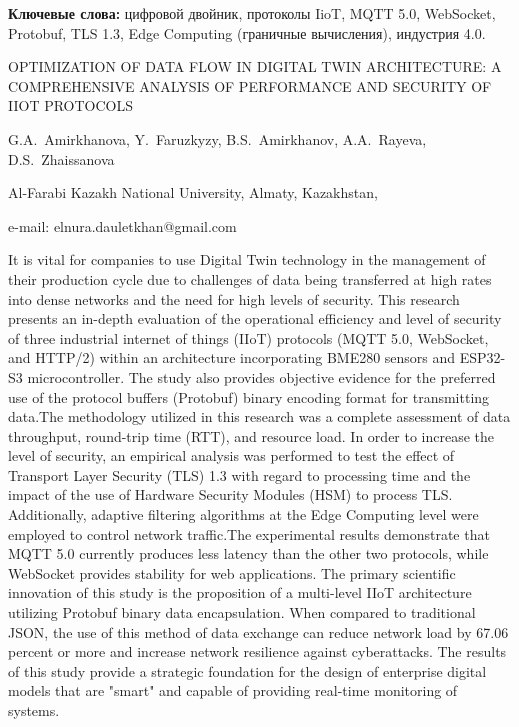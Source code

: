 {\bfseries Ключевые слова:} цифровой двойник, протоколы IioT, MQTT 5.0,
WebSocket, Protobuf, TLS 1.3, Edge Computing (граничные вычисления),
индустрия 4.0.

\begin{header}
OPTIMIZATION OF DATA FLOW IN DIGITAL TWIN ARCHITECTURE: A COMPREHENSIVE ANALYSIS OF PERFORMANCE AND SECURITY OF IIOT PROTOCOLS

G.A.~Amirkhanova,
Y.~Faruzkyzy\envelope,
B.S.~Amirkhanov,
A.A.~Rayeva,
D.S.~Zhaissanova
\end{header}

\begin{affil}
Al-Farabi Kazakh National University, Almaty, Kazakhstan,

e-mail: elnura.dauletkhan@gmail.com
\end{affil}

It is vital for companies to use Digital Twin technology in the
management of their production cycle due to challenges of data being
transferred at high rates into dense networks and the need for high
levels of security. This research presents an in-depth evaluation of the
operational efficiency and level of security of three industrial
internet of things (IIoT) protocols (MQTT 5.0, WebSocket, and HTTP/2)
within an architecture incorporating BME280 sensors and ESP32-S3
microcontroller. The study also provides objective evidence for the
preferred use of the protocol buffers (Protobuf) binary encoding format
for transmitting data.The methodology utilized in this research was a
complete assessment of data throughput, round-trip time (RTT), and
resource load. In order to increase the level of security, an empirical
analysis was performed to test the effect of Transport Layer Security
(TLS) 1.3 with regard to processing time and the impact of the use of
Hardware Security Modules (HSM) to process TLS. Additionally, adaptive
filtering algorithms at the Edge Computing level were employed to
control network traffic.The experimental results demonstrate that MQTT
5.0 currently produces less latency than the other two protocols, while
WebSocket provides stability for web applications. The primary
scientific innovation of this study is the proposition of a multi-level
IIoT architecture utilizing Protobuf binary data encapsulation. When
compared to traditional JSON, the use of this method of data exchange
can reduce network load by 67.06 percent or more and increase network
resilience against cyberattacks. The results of this study provide a
strategic foundation for the design of enterprise digital models that
are "smart" and capable of providing real-time monitoring of systems.

